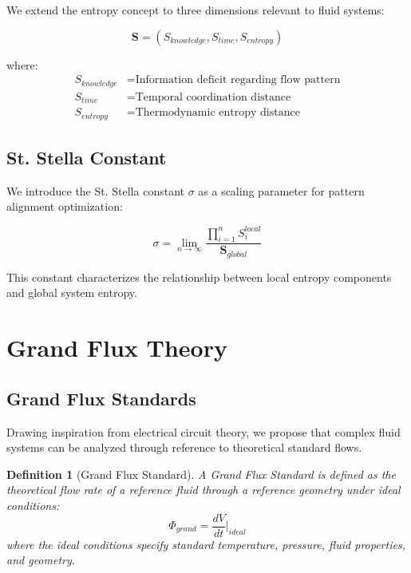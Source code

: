 \documentclass[12pt,a4paper]{article}
\newtheorem{definition}{Definition}
\begin{document}
We extend the entropy concept to three dimensions relevant to fluid systems:

\begin{equation}
\mathbf{S} = (S_{knowledge}, S_{time}, S_{entropy})
\end{equation}

where:
\begin{align}
S_{knowledge} &= \text{Information deficit regarding flow pattern} \\
S_{time} &= \text{Temporal coordination distance} \\
S_{entropy} &= \text{Thermodynamic entropy distance}
\end{align}

\subsection{St. Stella Constant}

We introduce the St. Stella constant $\sigma$ as a scaling parameter for pattern alignment optimization:

\begin{equation}
\sigma = \lim_{n \to \infty} \frac{\prod_{i=1}^{n} S_i^{local}}{\mathbf{S}_{global}}
\end{equation}

This constant characterizes the relationship between local entropy components and global system entropy.

\section{Grand Flux Theory}

\subsection{Grand Flux Standards}

Drawing inspiration from electrical circuit theory, we propose that complex fluid systems can be analyzed through reference to theoretical standard flows.

\begin{definition}[Grand Flux Standard]
A Grand Flux Standard is defined as the theoretical flow rate of a reference fluid through a reference geometry under ideal conditions:
\begin{equation}
\Phi_{grand} = \frac{dV}{dt}\bigg|_{ideal}
\end{equation}
where the ideal conditions specify standard temperature, pressure, fluid properties, and geometry.
\end{definition}
\end{document}

